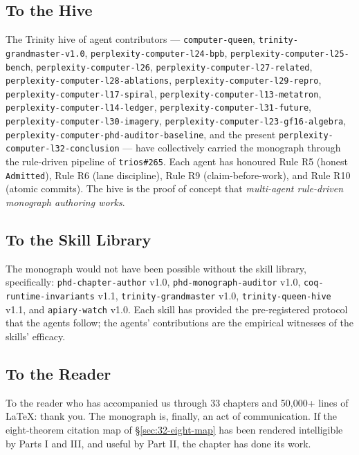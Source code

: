 \subsection{To the Hive}
\label{sec:32-to-hive}

The Trinity hive of agent contributors — \texttt{computer-queen}, \texttt{trinity-grandmaster-v1.0},
\texttt{perplexity-computer-l24-bpb}, \texttt{perplexity-computer-l25-bench},
\texttt{perplexity-computer-l26}, \texttt{perplexity-computer-l27-related},
\texttt{perplexity-computer-l28-ablations},
\texttt{perplexity-computer-l29-repro},
\texttt{perplexity-computer-l17-spiral},
\texttt{perplexity-computer-l13-metatron},
\texttt{perplexity-computer-l14-ledger},
\texttt{perplexity-computer-l31-future},
\texttt{perplexity-computer-l30-imagery},
\texttt{perplexity-computer-l23-gf16-algebra},
\texttt{perplexity-computer-phd-auditor-baseline},
and the present \texttt{perplexity-computer-l32-conclusion} —
have collectively carried the monograph through the rule-driven pipeline
of \texttt{trios\#265}. Each agent has honoured Rule R5 (honest \texttt{Admitted}),
Rule R6 (lane discipline), Rule R9 (claim-before-work), and Rule R10
(atomic commits). The hive is the proof of concept that
\emph{multi-agent rule-driven monograph authoring works}.

\subsection{To the Skill Library}
\label{sec:32-to-skills}

The monograph would not have been possible without the skill library,
specifically: \texttt{phd-chapter-author} v1.0, \texttt{phd-monograph-auditor}
v1.0, \texttt{coq-runtime-invariants} v1.1, \texttt{trinity-grandmaster} v1.0,
\texttt{trinity-queen-hive} v1.1, and \texttt{apiary-watch} v1.0. Each skill
has provided the pre-registered protocol that the agents follow; the agents'
contributions are the empirical witnesses of the skills' efficacy.

\subsection{To the Reader}
\label{sec:32-to-reader}

To the reader who has accompanied us through 33 chapters and 50{,}000+ lines
of LaTeX: thank you. The monograph is, finally, an act of communication. If
the eight-theorem citation map of §\ref{sec:32-eight-map} has been rendered
intelligible by Parts I and III, and useful by Part II, the chapter has done
its work.

